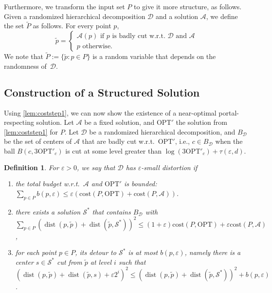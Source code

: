\documentclass[11pt]{article}
\newtheorem{definition}[theorem]{Definition}
\newcommand{\opt}{\text{OPT}}
\newcommand{\eps}{\varepsilon}
\newcommand{\cost}{\mathrm{cost}}
\renewcommand{\tilde}{\widetilde}
\newcommand{\calD}{\mathcal {D}}
\newcommand{\calS}{\mathcal {S}}
\newcommand{\calL}{\mathcal{A}}
\newcommand{\offset}{\tau(\eps, d)}
\DeclareMathOperator{\dist}{dist}
\newcommand{\lpar}{\left(}
\newcommand{\rpar}{\right)}
\newcommand{\david}[1]{\textcolor{orange}{#1}}
\begin{document}
Furthermore, we transform the input set $P$ to give it more structure, as follows.
Given a randomized hierarchical decomposition $\calD$ and a solution $\calL$, we define the set $\tilde P$ as follows. For every point $p$, 
\begin{equation*}
\tilde p = \begin{cases}
    \calL(p) \text{ if $p$ is badly cut w.r.t.\ } \calD \text{ and } \calL\\ p \text{ otherwise.}
\end{cases}
\end{equation*}
We note that $\tilde P := \{\tilde p: p \in P\}$ is a random variable that depends on the randomness of~$\calD$.

\subsection{Construction of a Structured Solution}\label{sec:constructS*}

Using \cref{lem:coststep1}, we can now show the existence of a near-optimal portal-respecting solution. 
Let $\calL$ be a fixed solution, and $\opt'$ the solution from \cref{lem:coststep1} for $P$.
 Let $\calD$ be a randomized hierarchical decomposition, and $B_{\calD}$ be the set of centers of $\calL$ that are badly cut w.r.t.\ $\opt'$, i.e., $c\in B_{\calD}$ when the ball $B(c,3\opt'_c)$ is cut at some level greater than $\log(3\opt'_c)+\offset$. 


\begin{definition}\label{def:smallDist}
For $\eps  > 0$, we say that $\calD$ has $\eps$-\emph{small distortion} if 
\begin{enumerate}
\item \label{prop:budget} 
the total budget w.r.t.\ $\calL$ and $\opt'$ is bounded: $\sum_{p \in P} b(p, \eps) \leq \eps (\cost(P, \opt) + \cost(P, \calL))$.
\item\label{prop:costSstar} there exists a solution $ \calS^*$ that contains $B_{\calD}$ 
with $\sum_{p \in P} \lpar \dist(p, \tilde p) + \dist(\tilde p,  \calS^*)\rpar^2 \leq (1+\eps)\cost(P, \opt) + \eps \cost(P, \calL)$,
\item\label{prop:det} for each point $p \in P$, its detour to $\calS^*$ is at most $b(p, \eps)$, namely there is a center $s \in \calS^*$ cut from $\tilde p$ at level $i$ such that $(\dist(p, \tilde p) + \dist(\tilde p, s) + \eps 2^i)^2 \leq \lpar\dist(p, \tilde p) + \dist(\tilde p, \calS^*)\rpar^2 + b(p, \eps)$.
\end{enumerate}
\end{definition}
\end{document}
